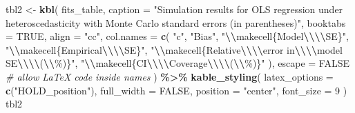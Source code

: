 \documentclass[
  twocolumn]{article}
\newenvironment{Shaded}{\begin{snugshade}}{\end{snugshade}}
\newcommand{\AttributeTok}[1]{\textcolor[rgb]{0.13,0.29,0.53}{#1}}
\newcommand{\CommentTok}[1]{\textcolor[rgb]{0.56,0.35,0.01}{\textit{#1}}}
\newcommand{\ConstantTok}[1]{\textcolor[rgb]{0.56,0.35,0.01}{#1}}
\newcommand{\DecValTok}[1]{\textcolor[rgb]{0.00,0.00,0.81}{#1}}
\newcommand{\FunctionTok}[1]{\textcolor[rgb]{0.13,0.29,0.53}{\textbf{#1}}}
\newcommand{\NormalTok}[1]{#1}
\newcommand{\OtherTok}[1]{\textcolor[rgb]{0.56,0.35,0.01}{#1}}
\newcommand{\SpecialCharTok}[1]{\textcolor[rgb]{0.81,0.36,0.00}{\textbf{#1}}}
\newcommand{\StringTok}[1]{\textcolor[rgb]{0.31,0.60,0.02}{#1}}
\begin{document}
\begin{Shaded}
\begin{Highlighting}[]
\NormalTok{tbl2 }\OtherTok{\textless{}{-}} \FunctionTok{kbl}\NormalTok{(}
\NormalTok{  fits\_table,}
  \AttributeTok{caption   =} \StringTok{"Simulation results for OLS regression under heteroscedasticity with Monte Carlo standard errors (in parentheses)"}\NormalTok{,}
  \AttributeTok{booktabs  =} \ConstantTok{TRUE}\NormalTok{,}
  \AttributeTok{align     =} \StringTok{"cc"}\NormalTok{,}
  \AttributeTok{col.names =} \FunctionTok{c}\NormalTok{(}
    \StringTok{"c"}\NormalTok{, }
    \StringTok{"Bias"}\NormalTok{, }
    \StringTok{"}\SpecialCharTok{\textbackslash{}\textbackslash{}}\StringTok{makecell\{Model}\SpecialCharTok{\textbackslash{}\textbackslash{}\textbackslash{}\textbackslash{}}\StringTok{SE\}"}\NormalTok{, }
    \StringTok{"}\SpecialCharTok{\textbackslash{}\textbackslash{}}\StringTok{makecell\{Empirical}\SpecialCharTok{\textbackslash{}\textbackslash{}\textbackslash{}\textbackslash{}}\StringTok{SE\}"}\NormalTok{, }
    \StringTok{"}\SpecialCharTok{\textbackslash{}\textbackslash{}}\StringTok{makecell\{Relative}\SpecialCharTok{\textbackslash{}\textbackslash{}\textbackslash{}\textbackslash{}}\StringTok{error in}\SpecialCharTok{\textbackslash{}\textbackslash{}\textbackslash{}\textbackslash{}}\StringTok{model SE}\SpecialCharTok{\textbackslash{}\textbackslash{}\textbackslash{}\textbackslash{}}\StringTok{(}\SpecialCharTok{\textbackslash{}\textbackslash{}}\StringTok{\%)\}"}\NormalTok{, }
    \StringTok{"}\SpecialCharTok{\textbackslash{}\textbackslash{}}\StringTok{makecell\{CI}\SpecialCharTok{\textbackslash{}\textbackslash{}\textbackslash{}\textbackslash{}}\StringTok{Coverage}\SpecialCharTok{\textbackslash{}\textbackslash{}\textbackslash{}\textbackslash{}}\StringTok{(}\SpecialCharTok{\textbackslash{}\textbackslash{}}\StringTok{\%)\}"}
\NormalTok{  ),}
  \AttributeTok{escape =} \ConstantTok{FALSE}   \CommentTok{\# allow LaTeX code inside names}
\NormalTok{) }\SpecialCharTok{\%\textgreater{}\%}
  \FunctionTok{kable\_styling}\NormalTok{(}
    \AttributeTok{latex\_options =} \FunctionTok{c}\NormalTok{(}\StringTok{"HOLD\_position"}\NormalTok{),}
    \AttributeTok{full\_width    =} \ConstantTok{FALSE}\NormalTok{,}
    \AttributeTok{position      =} \StringTok{"center"}\NormalTok{,}
    \AttributeTok{font\_size     =} \DecValTok{9}
\NormalTok{  )}
\NormalTok{tbl2}
\end{Highlighting}
\end{Shaded}
\end{document}
